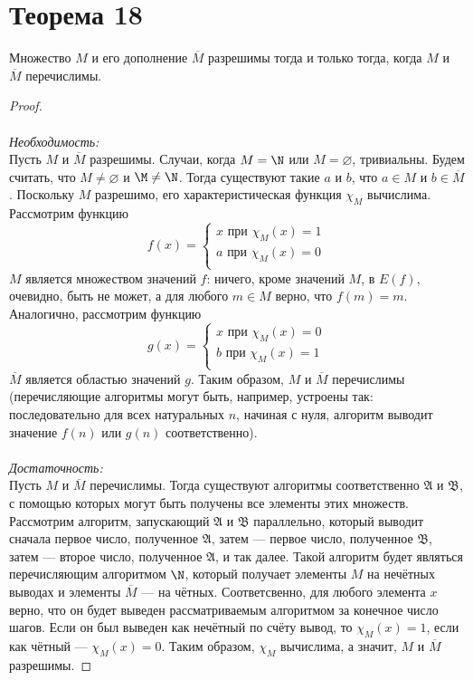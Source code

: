 \documentclass[a4paper,12pt]{article}
\begin{document}
    \section {Теорема 18}
    \begin{theorem}
    Множество $M$ и его дополнение $\overline{M}$ разрешимы тогда и только тогда, когда $M$ и $\overline{M}$ перечислимы.
    \end{theorem}
    \begin{proof}
    \strut\\\\\textit{Необходимость:}\smallskip\\
    Пусть $M$ и $\overline{M}$ разрешимы. Случаи, когда $M=\N$ или $M=\varnothing$, тривиальны. Будем считать, что $M\ne\varnothing$ и $\M\ne\N$. Тогда существуют такие $a$ и $b$, что $a\in M$ и $b\in\overline{M}$. Поскольку $M$ разрешимо, его характеристическая функция $\chi_M$ вычислима. Рассмотрим функцию 
    $$f(x) = 
    \begin{cases}
    x \text{ при } \chi_M(x) = 1 \\
    a \text{ при } \chi_M(x) = 0 \\
    \end{cases}
    $$
    $M$ является множеством значений $f$: ничего, кроме значений $M$, в $E(f)$, очевидно, быть не может, а для любого $m\in M$ верно, что $f(m)=m$. Аналогично, рассмотрим функцию
    $$g(x) = 
    \begin{cases}
    x \text{ при } \chi_M(x) = 0 \\
    b \text{ при } \chi_M(x) = 1 \\
    \end{cases}
    $$
    $\overline{M}$ является областью значений $g$. Таким образом, $M$ и $\overline{M}$ перечислимы (перечисляющие алгоритмы могут быть, например, устроены так: последовательно для всех натуральных $n$, начиная с нуля, алгоритм выводит значение $f(n)$ или $g(n)$ соответственно).\\\\
    \textit{Достаточность:}\smallskip\\
    Пусть $M$ и $\overline{M}$ перечислимы. Тогда существуют алгоритмы соответственно $\mathfrak{A}$ и $\mathfrak{B}$, с помощью которых могут быть получены все элементы этих множеств. Рассмотрим алгоритм, запускающий $\mathfrak{A}$ и $\mathfrak{B}$ параллельно, который выводит сначала первое число, полученное $\mathfrak{A}$, затем --- первое число, полученное $\mathfrak{B}$, затем --- второе число, полученное $\mathfrak{A}$, и так далее. Такой алгоритм будет являться перечисляющим алгоритмом $\N$, который получает элементы $M$ на нечётных выводах и элементы $\overline{M}$ --- на чётных. Соответсвенно, для любого элемента $x$ верно, что он будет выведен рассматриваемым алгоритмом за конечное число шагов. Если он был выведен как нечётный по счёту вывод, то $\chi_M(x)=1$, если как чётный --- $\chi_M(x)=0$. Таким образом, $\chi_M$ вычислима, а значит, $M$ и $\overline{M}$ разрешимы.
    \end{proof}
    
\end{document}
